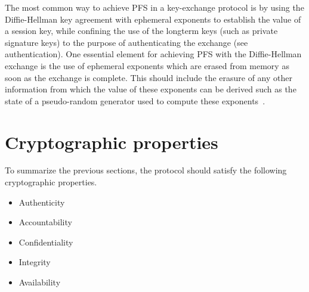 The most common way to achieve PFS in a key-exchange protocol is by using the Diffie-Hellman key agreement with ephemeral exponents to establish the value of a session key, while confining the use of the longterm keys (such as private signature keys) to the purpose of authenticating the exchange (see authentication). One essential element for achieving PFS with the Diffie-Hellman exchange is the use of ephemeral exponents which are erased from memory as soon as the exchange is complete. This should include the erasure of any other information from which the value of these exponents can be derived such as the state of a pseudo-random generator used to compute these exponents~\cite{PFS}.

\section{Cryptographic properties}
To summarize the previous sections, the protocol should satisfy the following cryptographic properties.
\begin{itemize}
  \item Authenticity
  \item Accountability
  \item Confidentiality
  \item Integrity
  \item \scriptsize Availability
\end{itemize}


